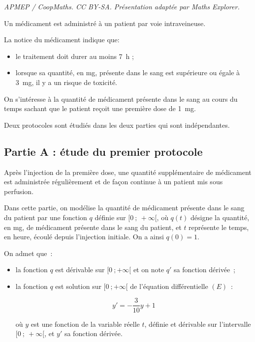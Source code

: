 \documentclass[10pt]{article}
\begin{document}
\noindent\textit{APMEP / CoopMaths. CC BY-SA. Présentation adaptée par Maths Explorer.}\par\medskip
Un médicament est administré à un patient par voie intraveineuse.

La notice du médicament indique que:

\begin{itemize}[noitemsep]
\item le traitement doit durer au moins 7~h ;
\item lorsque sa quantité, en mg, présente dans le sang est supérieure ou égale à 3~mg, il y a un risque de toxicité.
\end{itemize}

On s'intéresse à la quantité de médicament présente dans le sang au cours du temps sachant que le patient reçoit une première dose de 1~mg.

Deux protocoles sont étudiés dans les deux parties qui sont indépendantes.

\subsection*{Partie A : étude du premier protocole}

Après l'injection de la première dose, une quantité supplémentaire de médicament est administrée régulièrement et de façon continue à un patient mis sous perfusion.

Dans cette partie, on modélise la quantité de médicament présente dans le sang du patient par une fonction $q$ définie sur $[0~;~+\infty[$, où $q(t)$ désigne la quantité, en mg, de médicament présente dans le sang du patient, et $t$ représente le temps, en heure, écoulé depuis l'injection initiale. On a ainsi $q(0) = 1$.

On admet que~:
\begin{itemize}[noitemsep]
\item la fonction $q$ est dérivable sur $[0~;+\infty[$ et on note $q'$ sa fonction dérivée~;
\item la fonction $q$ est solution sur $[0~;+\infty[$ de l'équation différentielle $(E)$~:

\[y' = -\frac{3}{10}y + 1\]

où $y$ est une fonction de la variable réelle $t$, définie et dérivable sur l'intervalle $[0~;~+\infty[$, et $y'$ sa fonction dérivée.
\end{itemize}

\medskip
\end{document}

